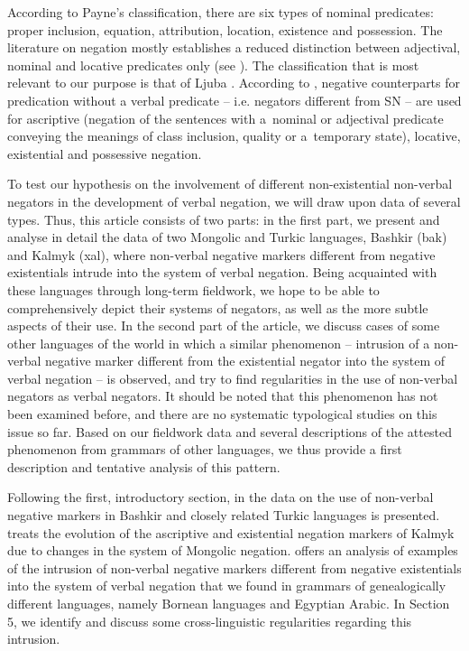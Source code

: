 \documentclass[output=paper,draft,draftmode,colorlinks,citecolor=brown]{langscibook}
\begin{document}
According to Payne’s \citeyearpar{Payne1997} classification, there are six types of nominal predicates: proper inclusion, equation, attribution, location, existence and possession. The literature on negation mostly establishes a reduced distinction between adjectival, nominal and locative predicates only (see \citealp{dryer2007a}). The classification that is most relevant to our purpose is that of Ljuba \citet{Veselinova2015}. According to \citet[550]{Veselinova2015}, negative counterparts for predication without a verbal predicate – i.e. negators different from SN – are used for ascriptive (negation of the sentences with a nominal or adjectival predicate conveying the meanings of class inclusion, quality or a temporary state), locative, existential and possessive negation.

To test our hypothesis on the involvement of different non-existential non-verbal negators in the development of verbal negation, we will draw upon data of several types. Thus, this article consists of two parts: in the first part, we present and analyse in detail the data of two Mongolic and Turkic languages, Bashkir (bak) and Kalmyk (xal), where non-verbal negative markers different from negative existentials intrude into the system of verbal negation. Being acquainted with these languages through long-term fieldwork, we hope to be able to comprehensively depict their systems of negators, as well as the more subtle aspects of their use. In the second part of the article, we discuss cases of some other languages of the world in which a similar phenomenon – intrusion of a non-verbal negative marker different from the existential negator into the system of verbal negation – is observed, and try to find regularities in the use of non-verbal negators as verbal negators. It should be noted that this phenomenon has not been examined before, and there are no systematic typological studies on this issue so far. Based on our fieldwork data and several descriptions of the attested phenomenon from grammars of other languages, we thus provide a first description and tentative analysis of this pattern.

Following the first, introductory section, in  the data on the use of non-verbal negative markers in Bashkir and closely related Turkic languages is presented.  treats the evolution of the ascriptive and existential negation markers of Kalmyk due to changes in the system of Mongolic negation.  offers an analysis of examples of the intrusion of non-verbal negative markers different from negative existentials into the system of verbal negation that we found in grammars of genealogically different languages, namely Bornean languages and Egyptian Arabic. In Section 5, we identify and discuss some cross-linguistic regularities regarding this intrusion.
\end{document}
